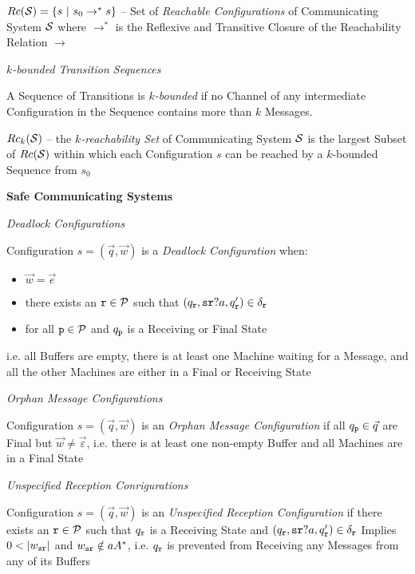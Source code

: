 $Rc(\mathcal{S}) = \{ s \ |\ s_0 \rightarrow^* s \}$ -- Set of
\emph{Reachable Configurations} of Communicating System $\mathcal{S}$
where $\rightarrow^*$ is the Reflexive and Transitive Closure of the
Reachability Relation $\rightarrow$

\emph{$k$-bounded Transition Sequences}

A Sequence of Transitions is \emph{$k$-bounded} if no Channel of any
intermediate Configuration in the Sequence contains more than $k$
Messages.

$Rc_k(\mathcal{S})$ -- the \emph{$k$-reachability Set} of Communicating
System $\mathcal{S}$ is the largest Subset of $Rc(\mathcal{S})$ within
which each Configuration $s$ can be reached by a $k$-bounded Sequence
from $s_0$


\textbf{Safe Communicating Systems}

\emph{Deadlock Configurations}

Configuration $s = (\vec{q},\vec{w})$ is a \emph{Deadlock
  Configuration} when:
\begin{itemize}
  \item $\vec{w} = \vec{e}$
  \item there exists an $\mathtt{r} \in \mathcal{P}$ such that
    $(q_\mathtt{r},\mathtt{sr}?a,q_\mathtt{r}') \in \delta_\mathtt{r}$
  \item for all $\mathtt{p} \in \mathcal{P}$ and $q_\mathtt{p}$ is a
    Receiving or Final State
\end{itemize}
i.e. all Buffers are empty, there is at least one Machine waiting for
a Message, and all the other Machines are either in a Final or
Receiving State

\emph{Orphan Message Configurations}

Configuration $s = (\vec{q},\vec{w})$ is an \emph{Orphan Message
  Configuration} if all $q_\mathtt{p} \in \vec{q}$ are Final but
$\vec{w} \neq \vec{\varepsilon}$, i.e. there is at least one non-empty
Buffer and all Machines are in a Final State

\emph{Unspecified Reception Conrigurations}

Configuration $s = (\vec{q},\vec{w})$ is an \emph{Unspecified
  Reception Configuration} if there exists an $\mathtt{r} \in
\mathcal{P}$ such that $q_\mathtt{r}$ is a Receiving State and
$(q_\mathtt{r},\mathtt{sr}?a,q_\mathtt{r}') \in \delta_\mathtt{r}$ Implies
$0 < |w_\mathtt{sr}|$ and $w_\mathtt{sr} \notin aA^*$, i.e.
$q_\mathtt{r}$ is prevented from Receiving any Messages from any of its
Buffers %


